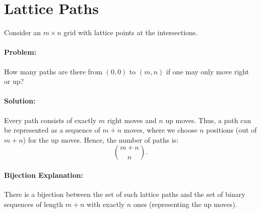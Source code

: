 \documentclass[docmute]{article}
\begin{document}
\section{Lattice Paths}
Consider an $m \times n$ grid with lattice points at the intersections.  
\paragraph{Problem:}  
How many paths are there from $(0,0)$ to $(m,n)$ if one may only move right or up?
\paragraph{Solution:}  
Every path consists of exactly $m$ right moves and $n$ up moves. Thus, a path can be represented as a sequence of $m+n$ moves, where we choose $n$ positions (out of $m+n$) for the up moves. Hence, the number of paths is:
\[
\binom{m+n}{n}.
\]

\paragraph{Bijection Explanation:}  
There is a bijection between the set of such lattice paths and the set of binary sequences of length $m+n$ with exactly $n$ ones (representing the up moves).
\end{document}
